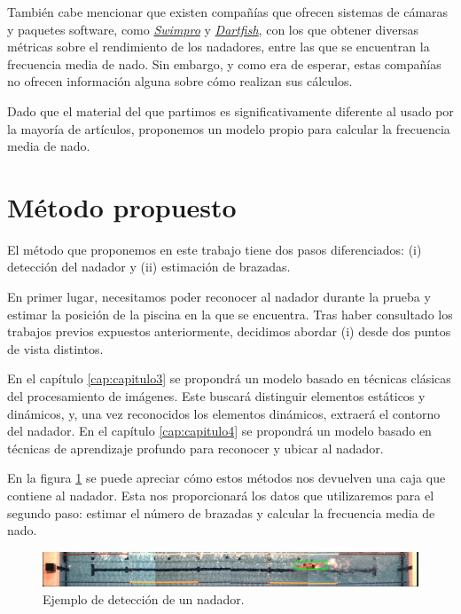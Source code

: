 También cabe mencionar que existen compañías que ofrecen sistemas de cámaras y paquetes software, como \textit{\href{https://www.swimmingcam.com/}{Swimpro}} y \textit{\href{https://www.dartfish.com/swimming}{Dartfish}}, con los que obtener diversas métricas sobre el rendimiento de los nadadores, entre las que se encuentran la frecuencia media de nado. Sin embargo, y como era de esperar, estas compañías no ofrecen información alguna sobre cómo realizan sus cálculos.

Dado que el material del que partimos es significativamente diferente al usado por la mayoría de artículos, proponemos un modelo propio para calcular la frecuencia media de nado. 

\section{Método propuesto}

El método que proponemos en este trabajo tiene dos pasos diferenciados: (i) detección del nadador y (ii) estimación de brazadas.

En primer lugar, necesitamos poder reconocer al nadador durante la prueba y estimar la posición de la piscina en la que se encuentra. Tras haber consultado los trabajos previos expuestos anteriormente, decidimos abordar (i) desde dos puntos de vista distintos.

En el capítulo \ref{cap:capitulo3} se propondrá un modelo basado en técnicas clásicas del procesamiento de imágenes. Este buscará distinguir elementos estáticos y dinámicos, y, una vez reconocidos los elementos dinámicos, extraerá el contorno del nadador. En el capítulo \ref{cap:capitulo4} se propondrá un modelo basado en técnicas de aprendizaje profundo para reconocer y ubicar al nadador. 

En la figura \ref{fig:primerejemplodeteccion} se puede apreciar cómo estos métodos nos devuelven una caja que contiene al nadador. Esta nos proporcionará los datos que utilizaremos para el segundo paso: estimar el número de brazadas y calcular la frecuencia media de nado. 

\begin{figure}
    \centering
    \includegraphics[width=\textwidth,height=\textheight,keepaspectratio]{imagenes/capitulo2/ejemplo_bbox.png}
    \caption{Ejemplo de detección de un nadador.}
    \label{fig:primerejemplodeteccion}
\end{figure}

